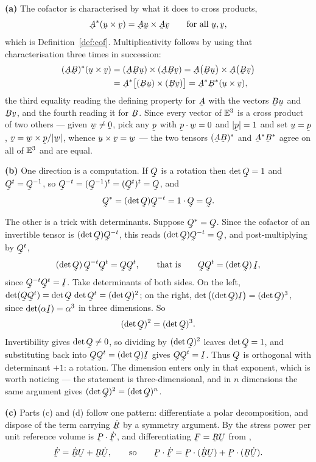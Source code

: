 \begin{solution}
\noindent\textbf{(a)}
The cofactor is characterised by what it does to cross products,
\[
   \bA^{*}(\bu\times\bv)=\bA\bu\times\bA\bv
   \qquad\text{for all }\bu,\bv ,
\]
which is Definition~\ref{def:cof}. Multiplicativity follows by using
that characterisation three times in succession:
\[
\begin{aligned}
   (\bA\bB)^{*}(\bu\times\bv)
   &=(\bA\bB\bu)\times(\bA\bB\bv)
    =\bA\big(\bB\bu\big)\times\bA\big(\bB\bv\big)\\
   &=\bA^{*}\big[(\bB\bu)\times(\bB\bv)\big]
    =\bA^{*}\bB^{*}(\bu\times\bv) ,
\end{aligned}
\]
the third equality reading the defining property for $\bA$ with the
vectors $\bB\bu$ and $\bB\bv$, and the fourth reading it for $\bB$.
Since every vector of $\mathbb{E}^{3}$ is a cross product of two others --- given
$\bw\neq\bze$, pick any $\bp$ with $\ip\bp\bw=0$ and $|\bp|=1$ and set
$\bu=\bp$, $\bv=\bw\times\bp/|\bw|$, whence
$\bu\times\bv=\bw$ --- the two tensors $(\bA\bB)^{*}$ and
$\bA^{*}\bB^{*}$ agree on all of $\mathbb{E}^{3}$ and are equal.

\medskip
\noindent\textbf{(b)}
One direction is a computation. If $\bQ$ is a rotation then
$\det\bQ=1$ and $\bQ^{t}=\bQ^{-1}$, so $\bQ^{-t}=(\bQ^{-1})^{t}
=(\bQ^{t})^{t}=\bQ$, and
\[
   \bQ^{*}=(\det\bQ)\bQ^{-t}=1\cdot\bQ=\bQ .
\]

The other is a trick with determinants. Suppose $\bQ^{*}=\bQ$. Since
the cofactor of an invertible tensor is $(\det\bQ)\bQ^{-t}$, this reads
$(\det\bQ)\bQ^{-t}=\bQ$, and post-multiplying by $\bQ^{t}$,
\[
   (\det\bQ)\,\bQ^{-t}\bQ^{t}=\bQ\bQ^{t},
   \qquad\text{that is}\qquad
   \bQ\bQ^{t}=(\det\bQ)\,\I ,
\]
since $\bQ^{-t}\bQ^{t}=\I$. Take determinants of both sides. On the
left, $\det(\bQ\bQ^{t})=\det\bQ\,\det\bQ^{t}=(\det\bQ)^{2}$; on the
right, $\det\big((\det\bQ)\I\big)=(\det\bQ)^{3}$, since
$\det(\alpha\I)=\alpha^{3}$ in three dimensions. So
\[
   (\det\bQ)^{2}=(\det\bQ)^{3} .
\]
Invertibility gives $\det\bQ\neq0$, so dividing by $(\det\bQ)^{2}$
leaves $\det\bQ=1$, and substituting back into
$\bQ\bQ^{t}=(\det\bQ)\I$ gives $\bQ\bQ^{t}=\I$. Thus $\bQ$ is
orthogonal with determinant $+1$: a rotation. The dimension enters only
in that exponent, which is worth noticing --- the statement is
three-dimensional, and in $n$ dimensions the same argument gives
$(\det\bQ)^{2}=(\det\bQ)^{n}$.

\medskip
\noindent\textbf{(c)}
Parts (c) and (d) follow one pattern: differentiate a polar
decomposition, and dispose of the term carrying $\dot\bR$ by a symmetry
argument. By  the stress power per unit reference volume is
$\bP\cdot\dot\bF$, and differentiating $\bF=\bR\bU$ from ,
\[
   \dot\bF=\dot\bR\bU+\bR\dot\bU ,
   \qquad\text{so}\qquad
   \bP\cdot\dot\bF=\bP\cdot(\dot\bR\bU)+\bP\cdot(\bR\dot\bU) .
\]


\end{solution}
